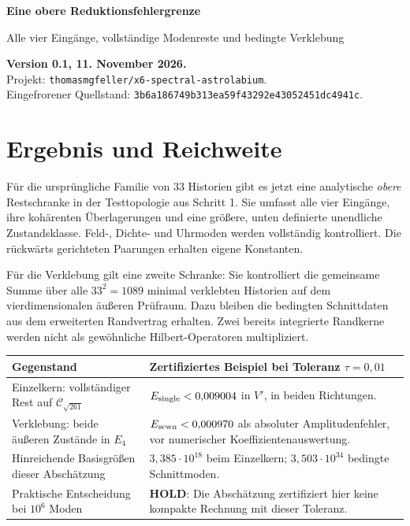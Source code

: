 \documentclass[10pt,a4paper]{article}
\begin{document}
{\color{ink}\LARGE\bfseries Eine obere Reduktionsfehlergrenze}\par
{\large Alle vier Eingänge, vollständige Modenreste und bedingte Verklebung}\par
\textbf{Version 0.1, 11. November 2026.}\\
Projekt: \texttt{thomasmgfeller/x6-spectral-astrolabium}.\\
Eingefrorener Quellstand: \texttt{3b6a186749b313ea59f43292e43052451dc4941c}.

\section*{Ergebnis und Reichweite}
Für die ursprüngliche Familie von 33 Historien gibt es jetzt eine analytische
\emph{obere} Restschranke in der Testtopologie aus Schritt 1. Sie umfasst alle
vier Eingänge, ihre kohärenten Überlagerungen und eine größere, unten definierte
unendliche Zustandsklasse. Feld-, Dichte- und Uhrmoden werden vollständig
kontrolliert. Die rückwärts gerichteten Paarungen erhalten eigene Konstanten.

Für die Verklebung gilt eine zweite Schranke: Sie kontrolliert die gemeinsame
Summe über alle $33^2=1089$ minimal verklebten Historien auf dem vierdimensionalen
äußeren Prüfraum. Dazu bleiben die bedingten Schnittdaten aus dem erweiterten
Randvertrag erhalten. Zwei bereits integrierte Randkerne werden nicht als
gewöhnliche Hilbert-Operatoren multipliziert.

\begin{center}\begin{tabular}{p{.43\linewidth}p{.48\linewidth}}\toprule
Gegenstand & Zertifiziertes Beispiel bei Toleranz $\tau=0{,}01$\\\midrule
Einzelkern: vollständiger Rest auf $\mathcal C_{\sqrt{261}}$ &
$E_{\rm single}<0{,}009004$ in $V'$, in beiden Richtungen.\\
Verklebung: beide äußeren Zustände in $E_4$ &
$E_{\rm sewn}<0{,}000970$ als absoluter Amplitudenfehler, vor numerischer Koeffizientenauswertung.\\
Hinreichende Basisgrößen dieser Abschätzung &
$3{,}385\cdot10^{18}$ beim Einzelkern; $3{,}503\cdot10^{34}$ bedingte Schnittmoden.\\
Praktische Entscheidung bei $10^6$ Moden &
\textbf{HOLD}: Die Abschätzung zertifiziert hier keine kompakte Rechnung mit dieser Toleranz.\\\bottomrule
\end{tabular}\end{center}
\end{document}
